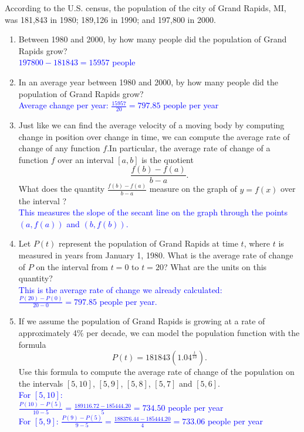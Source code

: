 \documentclass{ximera}
\begin{document}
\begin{exercise}
    According to the U.S. census, the population of the city of Grand Rapids, MI, was 181,843 in 1980; 189,126 in 1990; and 197,800 in 2000.
    \begin{enumerate}
        \item Between 1980 and 2000, by how many people did the population of Grand Rapids grow?\\
        \textcolor{blue}{$197800-181843=15957$ people}
        \item In an average year between 1980 and 2000, by how many people did the population of Grand Rapids grow?\\
        \textcolor{blue}{Average change per year: $\frac{15957}{20}=797.85$ people per year}
        \item Just like we can find the average velocity of a moving body by computing change in position over change in time, we can compute the average rate of change of any function $f$.In particular, the average rate of change of a function $f$ over an interval $[a,b]$ is the quotient
          \[\frac{f(b)-f(a)}{b-a}.\]
        What does the quantity  $\frac{f(b)-f(a)}{b-a}$ measure on the graph of $y=f(x)$ over the interval ?\\
        \textcolor{blue}{This measures the slope of the secant line on the graph through the points $(a,f(a))$ and $(b,f(b))$.}
        \item Let $P(t)$ represent the population of Grand Rapids at time $t$, where $t$ is measured in years from January 1, 1980. What is the average rate of change of $P$ on the interval from $t=0$ to $t=20$? What are the units on this quantity?\\
        \textcolor{blue}{This is the average rate of change we already calculated: $\frac{P(20)-P(0)}{20-0}=797.85$ people per year.}
        \item If we assume the population of Grand Rapids is growing at a rate of approximately 4\% per decade, we can model the population function with the formula
        \[P(t)=181843(1.04^{\frac{t}{10}}).\]
        Use this formula to compute the average rate of change of the population on the intervals $[5,10]$, $[5,9]$, $[5,8]$, $[5,7]$ and $[5,6]$.\\
        \textcolor{blue}{For $[5,10]$:\\
        $\frac{P(10)-P(5)}{10-5}=\frac{189116.72-185444.20}{5}=734.50$ people per year\\
        For $[5,9]$:
        $\frac{P(9)-P(5)}{9-5}=\frac{188376.44-185444.20}{4}=733.06$ people per year\\
}
\end{enumerate}
\end{exercise}
\end{document}
